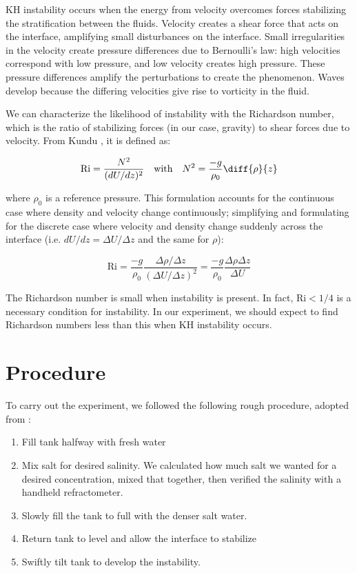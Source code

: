 \documentclass{article}
\begin{document}
KH instability occurs when the energy from velocity overcomes forces stabilizing
the stratification between the fluids. Velocity creates a shear force that acts
on the interface, amplifying small disturbances on the interface. Small
irregularities in the velocity create pressure differences due to Bernoulli's
law: high velocities correspond with low pressure, and low velocity creates high
pressure. These pressure differences amplify the perturbations to create the
phenomenon. Waves develop because the differing velocities give rise to
vorticity in the fluid.

We can characterize the likelihood of instability with the Richardson number,
which is the ratio of stabilizing forces (in our case, gravity) to shear forces
due to velocity. From Kundu \cite{kundu}, it is defined as:

\[ \text{Ri} = \frac{N^2}{(dU/dz)^2} \quad\text{with}\quad N^2 = \frac{-g}{\rho_0} \diff{\rho}{z} \]

where \(\rho_0\) is a reference pressure. This formulation accounts for the
continuous case where density and velocity change continuously; simplifying and
formulating for the discrete case where velocity and density change suddenly
across the interface (i.e. \(dU/dz = \Delta U / \Delta z\) and the same for
\(\rho\)):

\[ \text{Ri} = \frac{-g}{\rho_0} \frac{\Delta \rho / \Delta z}{(\Delta U / \Delta z)^2} = \frac{-g}{\rho_0} \frac{\Delta \rho \Delta z}{\Delta U}\]

The Richardson number is small when instability is present. In fact, \(\text{Ri}
< 1/4\) is a necessary condition for instability. In our experiment, we should
expect to find Richardson numbers less than this when KH instability occurs.

\section{Procedure}

To carry out the experiment, we followed the following rough procedure, adopted
from \cite{kh-instability-demo}:

\begin{enumerate}
    \item Fill tank halfway with fresh water
    \item Mix salt for desired salinity. We calculated how much salt we wanted
    for a desired concentration, mixed that together, then verified the salinity
    with a handheld refractometer.
    \item Slowly fill the tank to full with the denser salt water.
    \item Return tank to level and allow the interface to stabilize
    \item Swiftly tilt tank to develop the instability.
\end{enumerate}
\end{document}
